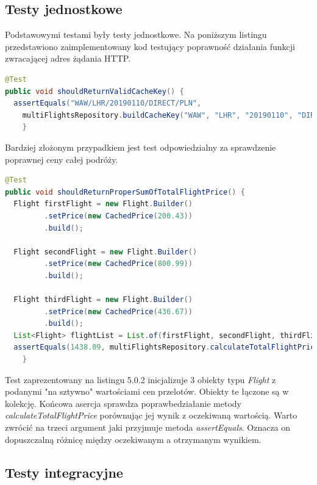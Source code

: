 \documentclass[12pt, twoside]{report}
\begin{document}
\subsection{Testy jednostkowe}
Podstawowymi testami były testy jednostkowe. Na poniższym listingu przedstawiono zaimplementowany kod testujący poprawność działania funkcji zwracającej adres żądania HTTP.
\begin{lstlisting}[language=java, caption=Przykładowy test jednostkowy]
@Test
public void shouldReturnValidCacheKey() {
  assertEquals("WAW/LHR/20190110/DIRECT/PLN",
    multiFlightsRepository.buildCacheKey("WAW", "LHR", "20190110", "DIRECT", "PLN"));
    }
\end{lstlisting}
Bardziej złożonym przypadkiem jest test odpowiedzialny za sprawdzenie poprawnej ceny całej podróży.
\begin{lstlisting}[language=java, caption=Przykładowy test jednostkowy]
@Test
public void shouldReturnProperSumOfTotalFlightPrice() {
  Flight firstFlight = new Flight.Builder()
         .setPrice(new CachedPrice(200.43))
         .build();
 
  Flight secondFlight = new Flight.Builder()
         .setPrice(new CachedPrice(800.99))
         .build();

  Flight thirdFlight = new Flight.Builder()
         .setPrice(new CachedPrice(436.67))
         .build();
  List<Flight> flightList = List.of(firstFlight, secondFlight, thirdFlight);
  assertEquals(1438.09, multiFlightsRepository.calculateTotalFlightPrice(flightList), 0.001);
    }
\end{lstlisting}
Test zaprezentowany na listingu 5.0.2 inicjalizuje 3 obiekty typu \textit{Flight} z podanymi "na sztywno" wartościami cen przelotów. Obiekty te łączone są w kolekcję. Końcowa asercja sprawdza poprawbedziałanie metody \textit{calculateTotalFlightPrice} porównując jej wynik z oczekiwaną wartością. Warto zwrócić na trzeci argument jaki przyjmuje metoda \textit{assertEquals}. Oznacza on dopuszczalną różnicę między oczekiwanym a otrzymanym wynikiem.
\newpage
\subsection{Testy integracyjne}

\newpage
\end{document}
